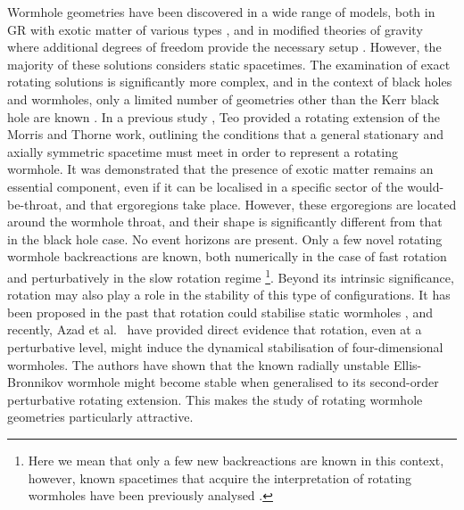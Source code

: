 \documentclass[aps,preprint,groupedaddress,nofootinbib,superscriptaddress,showkeys,showpacs,eqsecnum,amsmath,amssymb]{revtex4-1}
\begin{document}
Wormhole geometries have been discovered in a wide range of models, both in GR with exotic matter of various types \cite{Hochberg:1996ee,Konoplya:2021hsm,Lobo:2005us,Bronnikov:2005gm}, and in modified theories of gravity where additional degrees of freedom provide the necessary setup \cite{Lobo:2009ip,Antoniou:2019awm,Bronnikov:2013coa,Bronnikov:2015pha,Korolev:2014hwa,Harko:2013yb}. However, the majority of these solutions considers static spacetimes. The examination of exact rotating solutions is significantly more complex, and in the context of black holes and wormholes, only a limited number of geometries other than the Kerr black hole are known \cite{Stephani:2003tm}. In a previous study \cite{Teo:1998dp}, Teo provided a rotating extension of the Morris and Thorne work, outlining the conditions that a general stationary and axially symmetric spacetime must meet in order to represent a rotating wormhole. It was demonstrated that the presence of exotic matter remains an essential component, even if it can be localised in a specific sector of the would-be-throat, and that ergoregions take place. However, these ergoregions are located around the wormhole throat, and their shape is significantly different from that in the black hole case. No event horizons are present. Only a few novel rotating wormhole backreactions are known, both numerically in the case of fast rotation and perturbatively in the slow rotation regime \cite{Kashargin:2007mm,Kashargin:2008pk,Kleihaus:2014dla,Chew:2016epf}\footnote{Here we mean that only a few new backreactions are known in this context, however, known spacetimes that acquire the interpretation of rotating wormholes have been previously analysed \cite{Clement:2022pjr,Anabalon:2018rzq}.}. Beyond its intrinsic significance, rotation may also play a role in the stability of this type of configurations. It has been proposed in the past that rotation could stabilise static wormholes \cite{Matos:2005uh}, and recently, Azad et al.~\cite{Azad:2023iju} have provided direct evidence that rotation, even at a perturbative level, might induce the dynamical stabilisation of four-dimensional wormholes. The authors have shown that the known radially unstable Ellis-Bronnikov wormhole \cite{Ellis:1973yv,Bronnikov:1973fh} might become stable when generalised to its second-order perturbative rotating extension. This makes the study of rotating wormhole geometries particularly attractive.\\
\end{document}
